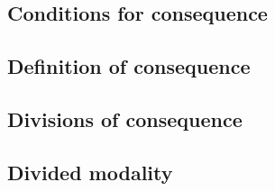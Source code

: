 \documentclass[]{article}
\begin{document}
\subsection{Conditions for consequence}
\subsection{Definition of consequence}
\subsection{Divisions of consequence}
\subsection{Divided modality}
\end{document}
